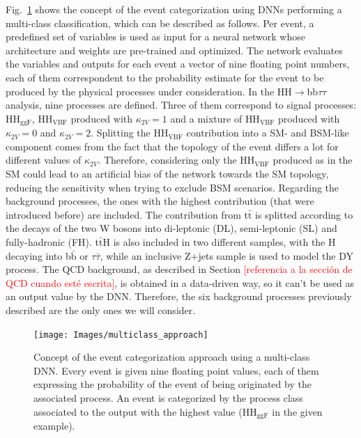 \documentclass[../main.tex]{subfiles}
\begin{document}
Fig.~\ref{fig:hh:multi_approach} shows the concept of the event categorization using DNNs performing a multi-class classification, which can be described as follows. Per event, a predefined set of variables is used as input for a neural network whose architecture and weights are pre-trained and optimized. The network evaluates the variables and outputs for each event a vector of nine floating point numbers, each of them correspondent to the probability estimate for the event to be produced by the physical processes under consideration. In the HH$\to$bb$\tau\tau$ analysis, nine processes are defined. Three of them correspond to signal processes: $\text{HH}_{\text{ggF}}$, $\text{HH}_{\text{VBF}}$ produced with $\kappa_{2V}=1$ and a mixture of $\text{HH}_{\text{VBF}}$ produced with $\kappa_{2V}=0$ and $\kappa_{2V}=2$. Splitting the $\text{HH}_{\text{VBF}}$ contribution into a SM- and BSM-like component comes from the fact that the topology of the event differs a lot for different values of $\kappa_{2V}$. Therefore, considering only the $\text{HH}_{\text{VBF}}$ produced as in the SM could lead to an artificial bias of the network towards the SM topology, reducing the sensitivity when trying to exclude BSM scenarios. Regarding the background processes, the ones with the highest contribution (that were introduced before) are included. The contribution from t$\bar{\text{t}}$ is splitted according to the decays of the two W bosons into di-leptonic (DL), semi-leptonic (SL) and fully-hadronic (FH). t$\bar{\text{t}}$H is also included in two different samples, with the H decaying into b$\bar{\text{b}}$ or $\tau\bar{\tau}$, while an inclusive Z+jets sample is used to model the DY process. The QCD background, as described in Section \textcolor{red}{[referencia a la sección de QCD cuando esté escrita]}, is obtained in a data-driven way, so it can't be used as an output value by the DNN. Therefore, the six background processes previously described are the only ones we will consider.


\begin{figure}[h!]
\texttt{[image: Images/multiclass\_approach]}
\caption{Concept of the event categorization approach using a multi-class DNN. Every event is given nine floating point values, each of them expressing the probability of the event of being originated by the associated process. An event is categorized by the process class associated to the output with the highest value ($\text{HH}_{\text{ggF}}$ in the given example).}
\label{fig:hh:multi_approach}
\end{figure}
\end{document}
